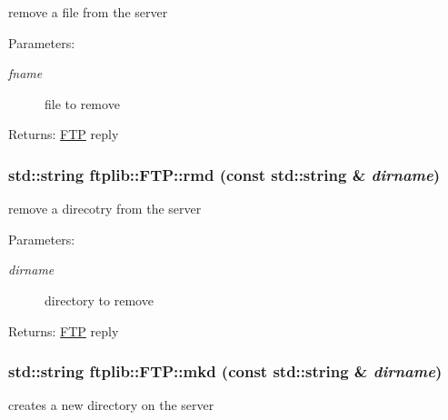 remove a file from the server 

\begin{Desc}
\item[Parameters:]
\begin{description}
\item[{\em fname}]file to remove \end{description}
\end{Desc}
\begin{Desc}
\item[Returns:]\hyperlink{classftplib_1_1FTP}{FTP} reply \end{Desc}
\hypertarget{classftplib_1_1FTP_2a96ea655350a479cdf5f34254fd4ac8}{
\subsubsection{\setlength{\rightskip}{0pt plus 5cm}std::string ftplib::FTP::rmd (const std::string \& {\em dirname})}}
\label{classftplib_1_1FTP_2a96ea655350a479cdf5f34254fd4ac8}


remove a direcotry from the server 

\begin{Desc}
\item[Parameters:]
\begin{description}
\item[{\em dirname}]directory to remove \end{description}
\end{Desc}
\begin{Desc}
\item[Returns:]\hyperlink{classftplib_1_1FTP}{FTP} reply \end{Desc}
\hypertarget{classftplib_1_1FTP_05c4b118a0e278e70c79c1c42484f669}{
\subsubsection{\setlength{\rightskip}{0pt plus 5cm}std::string ftplib::FTP::mkd (const std::string \& {\em dirname})}}
\label{classftplib_1_1FTP_05c4b118a0e278e70c79c1c42484f669}


creates a new directory on the server 


